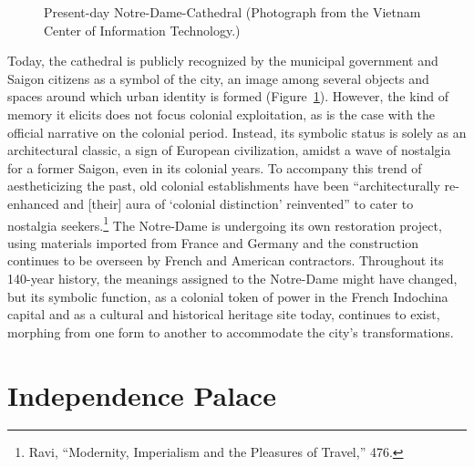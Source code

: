 \begin{figure}[!ht]
\begin{center}
\vspace{-.2 in}
\caption[Present-day Notre-Dame Cathedral]{Present-day Notre-Dame-Cathedral (Photograph from the Vietnam Center of Information Technology.\footnotemark) \en}\label{cathedral_present}
\end{center}
\vspace{-.2 in}
\end{figure}

Today, the cathedral is publicly recognized by the municipal government and Saigon citizens as a symbol of the city, an image among several objects and spaces around which urban identity is formed (Figure~\ref{cathedral_present}). However, the kind of memory it elicits does not focus colonial exploitation, as is the case with the official narrative on the colonial period. Instead, its symbolic status is solely as an architectural classic, a sign of European civilization, amidst a wave of nostalgia for a former Saigon, even in its colonial years. To accompany this trend of aestheticizing the past, old colonial establishments have been “architecturally re-enhanced and [their] aura of ‘colonial distinction’ reinvented” to cater to nostalgia seekers.\footnote{Ravi, “Modernity, Imperialism and the Pleasures of Travel,” 476.} The Notre-Dame is undergoing its own restoration project, using materials imported from France and Germany and the construction continues to be overseen by French and American contractors. Throughout its 140-year history, the meanings assigned to the Notre-Dame might have changed, but its symbolic function, as a colonial token of power in the French Indochina capital and as a cultural and historical heritage site today, continues to exist, morphing from one form to another to accommodate the city’s transformations. \en

\section{Independence Palace}

